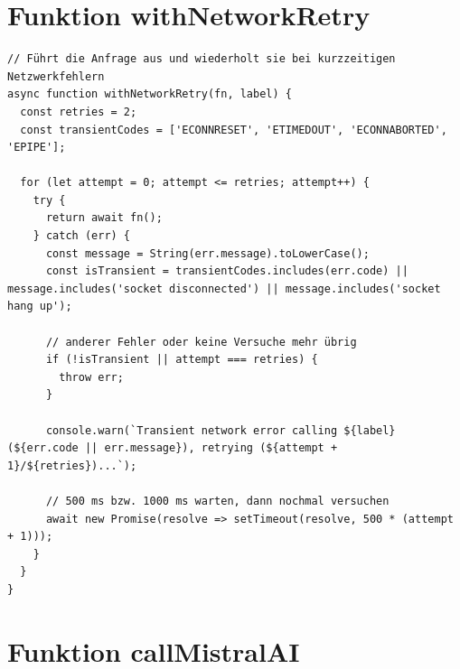 \section{Funktion withNetworkRetry}

\begin{lstlisting}
// Führt die Anfrage aus und wiederholt sie bei kurzzeitigen Netzwerkfehlern
async function withNetworkRetry(fn, label) {
  const retries = 2;
  const transientCodes = ['ECONNRESET', 'ETIMEDOUT', 'ECONNABORTED', 'EPIPE'];

  for (let attempt = 0; attempt <= retries; attempt++) {
    try {
      return await fn();
    } catch (err) {
      const message = String(err.message).toLowerCase();
      const isTransient = transientCodes.includes(err.code) || message.includes('socket disconnected') || message.includes('socket hang up');

      // anderer Fehler oder keine Versuche mehr übrig
      if (!isTransient || attempt === retries) {
        throw err;
      }

      console.warn(`Transient network error calling ${label} (${err.code || err.message}), retrying (${attempt + 1}/${retries})...`);

      // 500 ms bzw. 1000 ms warten, dann nochmal versuchen
      await new Promise(resolve => setTimeout(resolve, 500 * (attempt + 1)));
    }
  }
}
\end{lstlisting}

\section{Funktion callMistralAI}

